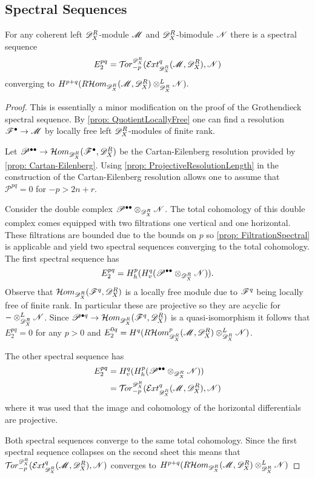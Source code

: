 \subsection{Spectral Sequences}
\begin{proposition}\label{prop: SpectralTorExt}
  For any coherent left $\mathscr{D}_X^R$-module $\mathscr{M}$ and $\mathscr{D}_X^R$-bimodule $\mathscr{N}$ there is a spectral sequence
  $$E_2^{pq}= \Tr{\D_X^R}{-p}(\Ex{\D_X^R}{q}(\M,\D_X^R), \N) $$
  converging to $H^{p+q} (R\mathcal{H}om_{\mathscr{D}_X^R}(\mathscr{M},\mathscr{D}_X^R)\otimes_{\mathscr{D}_X^R}^L \mathscr{N}).$
\end{proposition}
\begin{proof}
  This is essentially a minor modification on the proof of the Grothendieck spectral sequence.
  By \cref{prop: QuotientLocallyFree} one can find a resolution $\mathscr{F}^\bullet \to \mathscr{M}$ by locally free left $\mathscr{D}_X^R$-modules of finite rank.

  Let $\mathscr{P}^{\bullet\bullet}\to \mathcal{H}om_{\mathscr{D}_X^R}(\mathscr{F}^{\bullet},\mathscr{D}_X^R)$ be the Cartan-Eilenberg resolution provided by \cref{prop: Cartan-Eilenberg}.
  Using \cref{prop: ProjectiveResolutionLength} in the construction of the Cartan-Eilenberg resolution allows one to assume that $\mathscr{P}^{pq}=0$ for $-p>2n + r$.

  Consider the double complex $\mathscr{P}^{\bullet \bullet}\otimes_{\mathscr{D}_X^R}\mathscr{N}$.
  The total cohomology of this double complex comes equipped with two filtrations one vertical and one horizontal.
  These filtrations are bounded due to the bounds on $p$ so \cref{prop: FiltrationSpectral} is applicable and yield two spectral sequences converging to the total cohomology.
  The first spectral sequence has
  $$E_{2}^{pq} = H^p_h(H^q_v( \mathscr{P}^{\bullet \bullet}\otimes_{\mathscr{D}_X^R}\mathscr{N})).$$
  Observe that $\mathcal{H}om_{\mathscr{D}_X^R}(\mathscr{F}^q, \mathscr{D}_X^R)$ is a locally free module due to $\mathscr{F}^q$ being locally free of finite rank.
  In particular these are projective so they are acyclic for ${-}\otimes_{\mathscr{D}_X^R}^L \mathscr{N}$.
  Since $\mathscr{P}^{\bullet q}\to \mathcal{H}om_{\mathscr{D}_X^R}(\mathscr{F}^q,\mathscr{D}_X^R)$ is a quasi-isomorphism it follows that $E_2^{pq}=0$ for any $p>0$ and $E_2^{0q} = H^{q} (R\mathcal{H}om_{\mathscr{D}_X^R}^p(\mathscr{M},\mathscr{D}_X^R)\otimes_{\mathscr{D}_X^R}^L \mathscr{N})$.

  The other spectral sequence has
  \begin{align*}
      E_2^{pq} &= H^q_v(H^p_h(\mathscr{P}^{\bullet\bullet}\otimes_{\D_X^R}\N))\\
      &=  \Tr{\D_X^R}{-p}(\Ex{\D_X^R}{q}(\M,\D_X^R), \N)
  \end{align*}
  where it was used that the image and cohomology of the horizontal differentials are projective.

  Both spectral sequences converge to the same total cohomology.
  Since the first spectral sequence collapses on the second sheet this means that $\Tr{\D_X^R}{-p}(\Ex{\D_X^R}{q}(\M,\D_X^R), \N)$ converges to $H^{p+q}( R\mathcal{H}om_{\mathscr{D}_X^R}(\mathscr{M},\mathscr{D}_X^R)\otimes_{\mathscr{D}_X^R}^L \mathscr{N})$
\end{proof}
